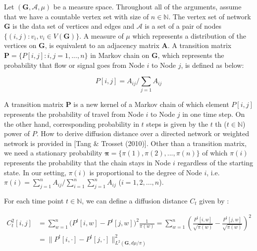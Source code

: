 \documentclass[12pt]{article}
\theoremstyle{definition}
\begin{document}
Let $(\boldsymbol{G}, \mathcal{A}, \mu)$ be a measure space. Throughout all of the arguments, assume that we have a countable vertex set with size of $n \in \mathbb{N}$. The vertex set of network $\boldsymbol{G}$ is the data set of vertices and edges and $\mathcal{A}$ is a set of a pair of nodes $\{(i,j) : v_{i}, v_{i} \in V(\boldsymbol{G}) \}$. A measure of $\mu$ which represents a distribution of the vertices on $\boldsymbol{G}$, is equivalent to an adjacency matrix $\boldsymbol{A}$. A transition matrix $\mathbf{P} = \{P[i,j] : i,j=1,...,n \}$ in Markov chain on $\boldsymbol{G}$, which represents the probability that flow or signal goes from Node $i$ to Node $j$, is defined as below:

\begin{equation}
P[i,j] = A_{ij} \big/ \sum\limits_{j=1} A_{ij}
\end{equation}

A transition matrix $\mathbf{P}$ is a new kernel of a Markov chain of which element $P[i,j]$ represents the probability of travel from Node $i$ to Node $j$ in one time step. On the other hand, corresponding probability in $t$ steps is given by the $t$ th ($t \in \mathbb{N}$) power of $P$. How to derive diffusion distance over a directed network or weighted network is provided in [Tang $\&$ Trosset (2010)]. Other than a transition matrix, we need a stationary probability $\boldsymbol{\pi} = \{\pi(1), \pi(2), ... , \pi(n) \}$ of which $\pi(i)$ represents the probability that the chain stays in Node $i$ regardless of the starting state. In our setting, $\pi(i)$ is proportional to the degree of Node $i$, i.e. $\pi(i) = \sum\limits_{j=1}^{n} A_{ij} \big/ \sum\limits_{i=1}^{n}\sum\limits_{j=1}^{n} A_{ij}$ ($i=1,2,..., n$).   

For each time point $t \in \mathbb{N}$, we can define a diffusion distance $C_{t}$  given by :

\begin{equation}
\begin{split}
C^2_{t}[i,j] & = \sum\limits_{w =1}^{n} \big( P^{t}[i,w] - P^{t}[j,w]  \big)^{2} \frac{1}{\pi(w)} = \sum\limits_{w=1}^{n} \left(  \frac{P^{t}[i,w]}{\sqrt{\pi(w)}} - \frac{P^{t}[j,w]}{\sqrt{\pi(w)}}   \right)^2 \\ & = \parallel P^{t}[i, \cdot] - P^{t}[j, \cdot]  \parallel^2_{L^{2}(\boldsymbol{G}, d\mu / \pi)  }
\end{split}
\end{equation}
\end{document}
